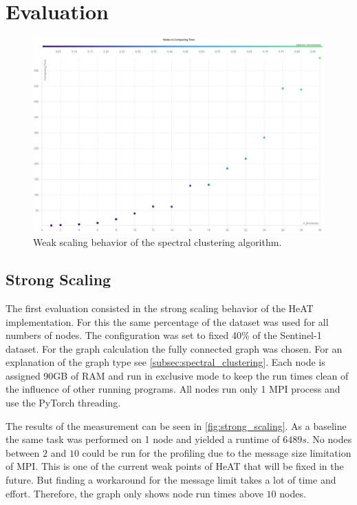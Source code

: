\section{Evaluation}
\label{sec:evaluation}


\begin{figure}
  \centering
  \includegraphics[width=0.9\linewidth]{images/weak_scaling_chart.png}
  \caption{Weak scaling behavior of the spectral clustering algorithm.}\label{fig:weak_scaling}
\end{figure}


\subsection{Strong Scaling}
\label{subsec:strong_scaling}


The first evaluation consisted in the strong scaling behavior of the \gls{HeAT} implementation.
For this the same percentage of the dataset was used for all numbers of nodes.
The configuration was set to fixed 40\% of the Sentinel-1 dataset.
For the graph calculation the fully connected graph was chosen. For an explanation of the graph type see \cref{subsec:spectral_clustering}.
Each node is assigned 90GB of \gls{RAM} and run in exclusive mode to keep the run times clean of the influence of other running programs.
All nodes run only 1 \gls{MPI} process and use the \gls{PyTorch} threading.

The results of the measurement can be seen in \cref{fig:strong_scaling}. As a baseline the same task was performed on 1 node and yielded a runtime of \(6489s\).
No nodes between \(2\) and \(10\) could be run for the profiling due to the message size limitation of \gls{MPI}. This is one of the current weak points
of \gls{HeAT} that will be fixed in the future.
But finding a workaround for the message limit takes a lot of time and effort.
Therefore, the graph only shows node run times above \(10\) nodes.

